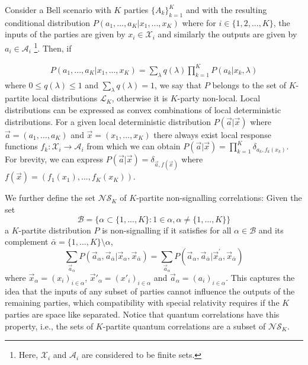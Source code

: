 \documentclass[pra,aps,reprint,superscriptaddress]{revtex4-2}
\theoremstyle{theorem}
\begin{document}
Consider a Bell scenario with $K$ parties $\{A_k\}_{k=1}^{K}$ and with the resulting conditional distribution $P(a_1,...,a_K|x_1,...,x_K)$ where for $i\in\{1,2,...,K\}$, the inputs of the parties are given by $x_i\in \mathcal{X}_i$ and similarly the outputs are given by $a_i\in \mathcal{A}_i$ \footnote{Here, $ \mathcal{X}_i$ and $\mathcal{A}_i$ are considered to be finite sets.}. Then, if

\begin{align}\nonumber
    P(a_1,...,a_K|x_1,...,x_K) = \sum_{\lambda} q(\lambda) \prod_{k=1}^K P(a_k|x_k,\lambda)
\end{align}
where $0\leq q(\lambda)\leq1$ and $\sum_\lambda q(\lambda) = 1$, we say that $P$ belongs to the set of $K$-partite local distributions $\mathcal{L}_K$, otherwise it is $K$-party non-local. Local distributions can be expressed as convex combinations of local deterministic distributions. For a given  local deterministic distribution $P(\vec a|\vec x)$ where $\vec a = (a_1,...,a_K)$ and $\vec x =(x_1,...,x_K)$ there always exist local response functions $f_k:\mathcal{X}_i \rightarrow \mathcal{A}_i$ from which we can obtain $P(\vec a |\vec x)=\prod_{k=1}^K\delta_{a_k,f_k(x_k)}$. For brevity, we can express $P(\vec a |\vec x)=\delta_{\vec a,f(\vec x)}$ where $f(\vec x) = (f_1(x_1),...,f_K(x_K))$. 

We further define the set $\mathcal{NS}_{K}$ of $K$-partite non-signalling correlations: Given the set
\begin{equation}\nonumber
\mathcal{B} = \{\alpha \subset \{1,...,K\}:1\in\alpha, \alpha \neq \{1,...,K\}\}
\end{equation}
a $K$-partite distribution $P$ is non-signalling if it satisfies for all $\alpha\in \mathcal{B}$ and its complement $\bar \alpha = \{1,...,K\}\setminus \alpha$,
\begin{equation}\nonumber
    \sum_{\vec{a}_\alpha}P(\vec{a}_\alpha,\vec{a}_{\bar \alpha}|\vec{x}_\alpha,\vec{x}_{\bar \alpha}) = \sum_{\vec{a}_\alpha}P(\vec{a}_\alpha,\vec{a}_{\bar \alpha}|\vec{x}_\alpha^\prime,\vec{x}_{\bar \alpha})
\end{equation}
where $\vec{x}_{ \alpha} = (x_i)_{i\in \alpha}$, $\vec{x}'_{ \alpha} = (x'_i)_{i\in \alpha}$ and $\vec{a}_{ \alpha} = (a_i)_{i\in \alpha}$. This captures the idea that the inputs of any subset of parties cannot influence the outputs of the remaining parties, which compatibility with special relativity requires if the $K$ parties are space like separated. Notice that quantum correlations have this property, i.e., the sets of $K$-partite quantum correlations are a subset of $\mathcal{NS}_{K}$. 
\end{document}
